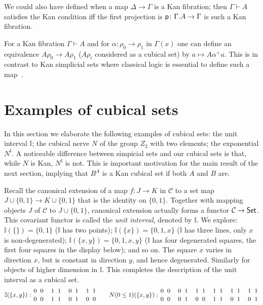 \documentclass[10pt,a4paper]{article}
\newcommand{\CC}{{\mathcal C}}
\newcommand{\pp}{{\sf p}}
\newcommand{\set}[1]{\{#1\}}
\newcommand{\interval}{\mathbb{I}}
\begin{document}
We could also have defined when a map $\Delta \to \Gamma$ is a Kan
fibration; then $\Gamma \vdash A$ satisfies the Kan condition if{f}
the first projection is $\pp \colon \Gamma.A \to \Gamma$ is such a Kan
fibration.

For a Kan fibration $\Gamma \vdash A$ and for $\alpha : \rho_0
\longrightarrow \rho_1$ in $\Gamma (x)$ one can define an equivalence
$A \rho_0 \to A \rho_1$ ($A\rho_i$ considered as a cubical set) by $a
\mapsto A \alpha^+ a$.  This is in contrast to Kan simplicial sets
where classical logic is essential to define such a map~\cite{BC}.


\section{Examples of cubical sets}\label{sec:examples}
In this section we elaborate the following examples of cubical sets:
the unit interval $\interval$; the cubical nerve $N$ of the group
$Z_2$ with two elements; the exponential $N^\interval$.  A noticeable
difference between simpicial sets and our cubical sets is that, while
$N$ is Kan, $N^\interval$ is not.  This is important motivation for
the main result of the next section, implying that $B^A$ is a Kan
cubical set if both $A$ and $B$ are.

Recall the canonical extension of a map $f:J\to K$ in $\CC$ to a set
map $J \cup \set{0,1} \to K\cup \set{0,1}$ that is the identity on
$\set{0,1}$.  Together with mapping objects $J$ of $\CC$ to $J \cup
\set{0,1}$, canonical extension actually forms a functor $\CC\to{\sf
  Set}$.  This covariant functor is called the \emph{unit interval},
denoted by $\interval$.  We explore: $\interval(\set{})=\set{0,1}$
($\interval$ has two points); $\interval(\set{x})=\set{0,1,x}$
($\interval$ has three lines, only $x$ is non-degenerated);
$\interval(\set{x,y})=\set{0,1,x,y}$ ($\interval$ has four degenerated
squares, the first four squares in the display below); and so on.  The
square $x$ varies in direction $x$, but is constant in direction $y$,
and hence degenerated.  Similarly for objects of higher dimension in
$\interval$.  This completes the description of the unit interval as a
cubical set.
\[
\def\olll{{1 \atop 0} ~ {1 \atop 1}}
\def\oool{{0 \atop 0} ~ {1 \atop 0}}
\def\oooo{{0 \atop 0} ~ {0 \atop 0}}
\def\llll{{1 \atop 1} ~ {1 \atop 1}}
\def\olol{{1 \atop 0} ~ {1 \atop 0}}
\def\ooll{{0 \atop 0} ~ {1 \atop 1}}
\def\Fxy{{0 \atop 0} ~ {0 \atop 0}}
\def\Txy{{1 \atop 1} ~ {1 \atop 1}}
\def\Iy{{1 \atop 0} ~ {1 \atop 0}}
\def\Ix{{0 \atop 0} ~ {1 \atop 1}}
\interval(\set{x,y}):\Fxy\quad\Txy\quad\Ix\quad\Iy\quad\quad
N(0\leq1)(\set{x,y}):\oooo\quad\ooll\quad\olol\quad\llll\quad\olll\quad\olll\]
\end{document}
